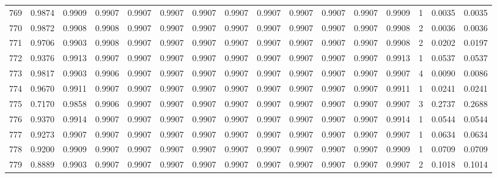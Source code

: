 \begin{tabular}{lrrrrrrrrrrrrrrr}
769 &      0.9874 &  0.9909 &  0.9907 &  0.9907 &  0.9907 &  0.9907 &  0.9907 &  0.9907 &  0.9907 &  0.9907 &   0.9907 &     0.9909 &      1 &                    0.0035 &                     0.0035 \\
770 &      0.9872 &  0.9908 &  0.9908 &  0.9907 &  0.9907 &  0.9907 &  0.9907 &  0.9907 &  0.9907 &  0.9907 &   0.9907 &     0.9908 &      2 &                    0.0036 &                     0.0036 \\
771 &      0.9706 &  0.9903 &  0.9908 &  0.9907 &  0.9907 &  0.9907 &  0.9907 &  0.9907 &  0.9907 &  0.9907 &   0.9907 &     0.9908 &      2 &                    0.0202 &                     0.0197 \\
772 &      0.9376 &  0.9913 &  0.9907 &  0.9907 &  0.9907 &  0.9907 &  0.9907 &  0.9907 &  0.9907 &  0.9907 &   0.9907 &     0.9913 &      1 &                    0.0537 &                     0.0537 \\
773 &      0.9817 &  0.9903 &  0.9906 &  0.9907 &  0.9907 &  0.9907 &  0.9907 &  0.9907 &  0.9907 &  0.9907 &   0.9907 &     0.9907 &      4 &                    0.0090 &                     0.0086 \\
774 &      0.9670 &  0.9911 &  0.9907 &  0.9907 &  0.9907 &  0.9907 &  0.9907 &  0.9907 &  0.9907 &  0.9907 &   0.9907 &     0.9911 &      1 &                    0.0241 &                     0.0241 \\
775 &      0.7170 &  0.9858 &  0.9906 &  0.9907 &  0.9907 &  0.9907 &  0.9907 &  0.9907 &  0.9907 &  0.9907 &   0.9907 &     0.9907 &      3 &                    0.2737 &                     0.2688 \\
776 &      0.9370 &  0.9914 &  0.9907 &  0.9907 &  0.9907 &  0.9907 &  0.9907 &  0.9907 &  0.9907 &  0.9907 &   0.9907 &     0.9914 &      1 &                    0.0544 &                     0.0544 \\
777 &      0.9273 &  0.9907 &  0.9907 &  0.9907 &  0.9907 &  0.9907 &  0.9907 &  0.9907 &  0.9907 &  0.9907 &   0.9907 &     0.9907 &      1 &                    0.0634 &                     0.0634 \\
778 &      0.9200 &  0.9909 &  0.9907 &  0.9907 &  0.9907 &  0.9907 &  0.9907 &  0.9907 &  0.9907 &  0.9907 &   0.9907 &     0.9909 &      1 &                    0.0709 &                     0.0709 \\
779 &      0.8889 &  0.9903 &  0.9907 &  0.9907 &  0.9907 &  0.9907 &  0.9907 &  0.9907 &  0.9907 &  0.9907 &   0.9907 &     0.9907 &      2 &                    0.1018 &                     0.1014 \\

\end{tabular}
